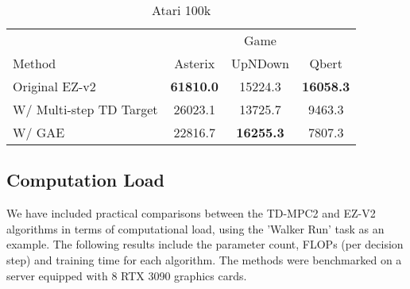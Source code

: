 \begin{table}[h]
    \centering
    \caption{Vision Control 100-200k}
    \label{visdm_abla}
\end{table}

\begin{table}[htbp]
    \centering
    \caption{Atari 100k}
    \label{atari_abla}
    \begin{tabular}{lccc}
        \toprule
        & \multicolumn{3}{c}{Game} \\
        \cmidrule{2-4}
        Method & Asterix & UpNDown & Qbert \\
        \midrule
        Original EZ-v2 & \textbf{61810.0} & 15224.3 & \textbf{16058.3} \\
        W/ Multi-step TD Target & 26023.1 & 13725.7 & 9463.3 \\
        W/ GAE & 22816.7 & \textbf{16255.3} & 7807.3 \\
        \bottomrule
    \end{tabular}
\end{table}


\subsection{Computation Load}
\label{load}

We have included practical comparisons between the TD-MPC2 and EZ-V2 algorithms in terms of computational load, using the 'Walker Run' task as an example. The following results include the parameter count, FLOPs (per decision step) and training time for each algorithm. The methods were benchmarked on a server equipped with 8 RTX 3090 graphics cards.


